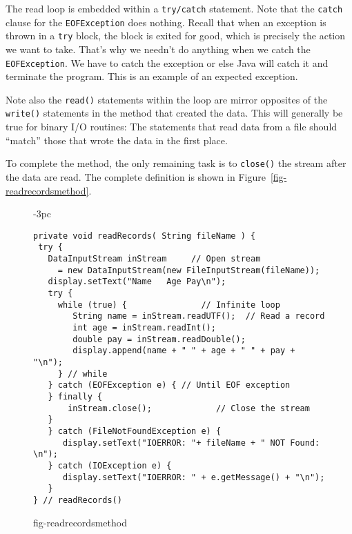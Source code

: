 \noindent The read loop is embedded within a {\tt try/catch}
statement.   Note that the {\tt catch} clause for the
{\tt EOFException} does nothing.  Recall that when an exception is thrown in
a {\tt try} block, the block is exited for good, which is precisely
the action we want to take.  That's why we needn't do anything when we
catch the {\tt EOFException}. We have to catch the exception or else
Java will catch it and terminate the program.  This is an
example of an expected exception.


\noindent Note also the {\tt read()} statements within the loop are mirror
opposites of the {\tt write()} statements in the method that created
the data.  This will generally be true for binary I/O routines: The
statements that read data from a file should ``match'' those that
wrote the data in the first place.


\noindent To complete the method, the only remaining task is to {\tt close()}
the stream after the data are read.  The complete definition is shown
in Figure~\ref{fig-readrecordsmethod}.

\begin{figure}[tb]
\jjjprogstart
\begin{jjjlistingleft}[29pc]{-3pc}
\begin{lstlisting}
private void readRecords( String fileName ) {
 try {
   DataInputStream inStream     // Open stream
     = new DataInputStream(new FileInputStream(fileName)); 
   display.setText("Name   Age Pay\n");
   try {
     while (true) {               // Infinite loop
        String name = inStream.readUTF();  // Read a record
        int age = inStream.readInt();
        double pay = inStream.readDouble();
        display.append(name + " " + age + " " + pay + "\n");
     } // while
   } catch (EOFException e) { // Until EOF exception
   } finally {
       inStream.close();             // Close the stream
   }
   } catch (FileNotFoundException e) {
      display.setText("IOERROR: "+ fileName + " NOT Found: \n");
   } catch (IOException e) {
      display.setText("IOERROR: " + e.getMessage() + "\n");
   }
} // readRecords()
\end{lstlisting}
\end{jjjlistingleft}
{fig-readrecordsmethod}
\end{figure}

